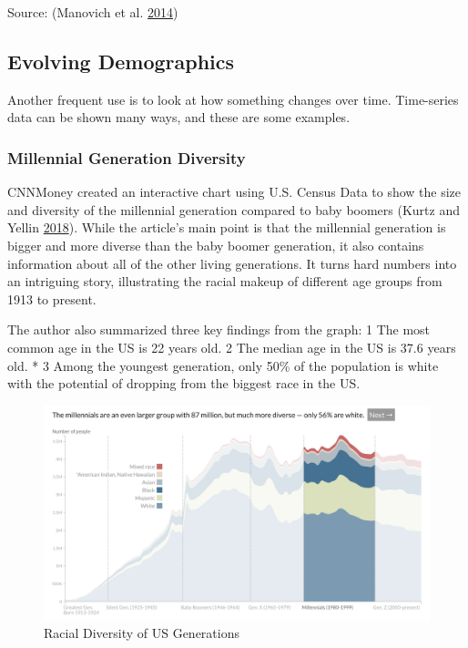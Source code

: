 \documentclass[]{book}
\begin{document}
Source: (Manovich et al. \protect\hyperlink{ref-selfie}{2014})

\hypertarget{evolving-demographics}{%
\subsection{Evolving Demographics}\label{evolving-demographics}}

Another frequent use is to look at how something changes over time. Time-series data can be shown many ways, and these are some examples.

\hypertarget{millennial-generation-diversity}{%
\subsubsection{Millennial Generation Diversity}\label{millennial-generation-diversity}}

CNNMoney created an interactive chart using U.S. Census Data to show the size and diversity of the millennial generation compared to baby boomers (Kurtz and Yellin \protect\hyperlink{ref-age_groups}{2018}). While the article's main point is that the millennial generation is bigger and more diverse than the baby boomer generation, it also contains information about all of the other living generations. It turns hard numbers into an intriguing story, illustrating the racial makeup of different age groups from 1913 to present.

The author also summarized three key findings from the graph:
1\textbar{} The most common age in the US is 22 years old.
2\textbar{} The median age in the US is 37.6 years old. *
3\textbar{} Among the youngest generation, only 50\% of the population is white with the potential of dropping from the biggest race in the US.

\begin{figure}
\centering
\includegraphics{images/millenials_diversity.png}
\caption{Racial Diversity of US Generations}
\end{figure}
\end{document}
